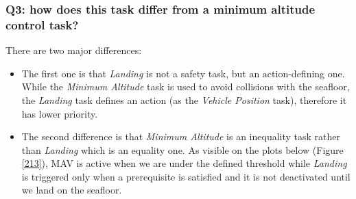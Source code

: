 \documentclass{article}
\begin{document}
\subsubsection{Q3: how does this task differ from a minimum altitude control task?}
There are two major differences:
\begin{itemize} 
\item The first one is that \textit{Landing} is not a safety task, but an action-defining one. While the \textit{Minimum Altitude} task is used to avoid collisions with the seafloor, the \textit{Landing} task defines an action (as the \textit{Vehicle Position} task), therefore it has lower priority.\\
\item The second difference is that \textit{Minimum Altitude} is an inequality task rather than \textit{Landing} which is an equality one. As visible on the plots below (Figure \ref{213}), MAV is active when we are under the defined threshold while \textit{Landing} is triggered only when a prerequisite is satisfied and it is not deactivated until we land on the seafloor.
\end{itemize}
\end{document}
